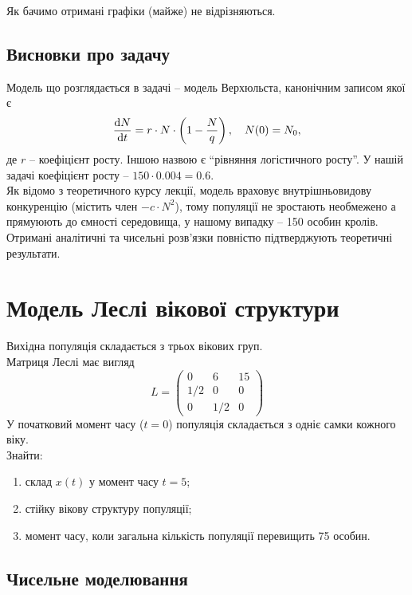 Як бачимо отримані графіки (майже) не відрізняються.

\subsection{Висновки про задачу}

Модель що розглядається в задачі -- модель Верхюльста, канонічним записом якої є 
\begin{equation*}
    \frac{\mathop{}\!\mathrm{d} N}{\mathop{}\!\mathrm{d} t} = r \cdot N \cdot \left( 1 - \frac{N}{q} \right), \quad N(0) = N_0,
\end{equation*}
де $r$ -- коефіцієнт росту. Іншою назвою є ``рівняння логістичного росту''. У нашій задачі коефіцієнт росту -- $150 \cdot 0.004 = 0.6$. \\

Як відомо з теоретичного курсу лекції, модель враховує внутрішньовидову конкуренцію (містить член $-c \cdot N^2$), тому популяції не зростають необмежено а прямуюють до ємності середовища, у нашому випадку -- 150 особин кролів. \\

Отримані аналітичні та чисельні розв'язки повністю підтверджують теоретичні результати.

\section{Модель Леслі вікової структури}

Вихідна популяція складається з трьох вікових груп. \\

Матриця Леслі має вигляд \[ L = \begin{pmatrix} 0 & 6 & 15 \\ 1/2 & 0 & 0 \\ 0 & 1/2 & 0 \end{pmatrix} \] У початковий момент часу ($t = 0$) популяція складається з одніє самки кожного віку. \\

Знайти:
\begin{enumerate}
	\item склад $x(t)$ у момент часу $t = 5$;
	\item стійку вікову структуру популяції;
	\item момент часу, коли загальна кількість популяції перевищить 75 особин.
\end{enumerate}

\subsection{Чисельне моделювання}

